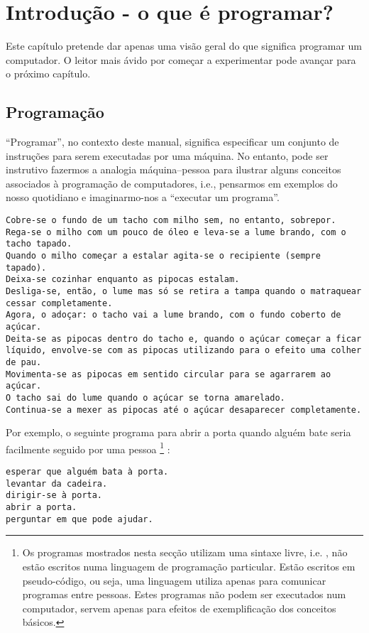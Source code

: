 \chapter{Introdução - o que é programar?}

Este capítulo pretende dar apenas uma visão geral do que significa programar um computador. O leitor mais ávido por começar a experimentar pode avançar para o próximo capítulo.

\section{Programação}
``Programar'', no contexto deste manual, significa especificar um conjunto de instruções para serem executadas por uma máquina. No entanto, pode ser instrutivo fazermos a analogia máquina--pessoa para ilustrar alguns conceitos associados à programação de computadores, i.e., pensarmos em exemplos do nosso quotidiano e imaginarmo-nos a ``executar um programa''.


\begin{lstlisting}[caption={Receita de pipocas. Adaptado de \url{http://lifestyle.sapo.pt/sabores/receitas/pipocas-doces-caseiras}.}, label=exe:receitaPipocas]
Cobre-se o fundo de um tacho com milho sem, no entanto, sobrepor. 
Rega-se o milho com um pouco de óleo e leva-se a lume brando, com o tacho tapado. 
Quando o milho começar a estalar agita-se o recipiente (sempre tapado).
Deixa-se cozinhar enquanto as pipocas estalam. 
Desliga-se, então, o lume mas só se retira a tampa quando o matraquear cessar completamente.
Agora, o adoçar: o tacho vai a lume brando, com o fundo coberto de açúcar. 
Deita-se as pipocas dentro do tacho e, quando o açúcar começar a ficar líquido, envolve-se com as pipocas utilizando para o efeito uma colher de pau. 
Movimenta-se as pipocas em sentido circular para se agarrarem ao açúcar. 
O tacho sai do lume quando o açúcar se torna amarelado.
Continua-se a mexer as pipocas até o açúcar desaparecer completamente.
\end{lstlisting}

Por exemplo, o seguinte programa para abrir a porta quando alguém bate seria facilmente seguido por uma pessoa%
\footnote{Os programas mostrados nesta secção utilizam uma sintaxe livre, i.e.%
, não estão escritos numa linguagem de programação particular. Estão escritos em pseudo-código, ou seja, uma linguagem utiliza apenas para comunicar programas entre 
pessoas. Estes programas não podem ser executados num computador, servem apenas para efeitos de exemplificação dos conceitos básicos.}%
:
\begin{lstlisting}[caption=Programa ``Atender a porta'', label=exe:atenderPorta]
esperar que alguém bata à porta.
levantar da cadeira.
dirigir-se à porta.
abrir a porta.
perguntar em que pode ajudar.
\end{lstlisting}

